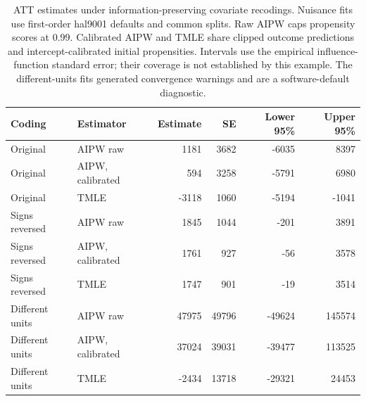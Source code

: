 \begin{table}[ht]
\centering
\small
\caption{ATT estimates under information-preserving covariate recodings.
Nuisance fits use first-order hal9001 defaults and common splits.
Raw AIPW caps propensity scores at 0.99. Calibrated AIPW and TMLE share
clipped outcome predictions and intercept-calibrated initial propensities.
Intervals use the empirical influence-function standard error; their
coverage is not established by this example. The different-units fits
generated convergence warnings and are a software-default diagnostic.}
\label{tab:causal}

\begin{tabular}{llrrrr}
\toprule
Coding & Estimator & Estimate & SE & Lower 95\% & Upper 95\%\\
\midrule
Original & AIPW raw & 1181 & 3682 & -6035 & 8397\\
Original & AIPW, calibrated & 594 & 3258 & -5791 & 6980\\
Original & TMLE & -3118 & 1060 & -5194 & -1041\\
Signs reversed & AIPW raw & 1845 & 1044 & -201 & 3891\\
Signs reversed & AIPW, calibrated & 1761 & 927 & -56 & 3578\\
\addlinespace
Signs reversed & TMLE & 1747 & 901 & -19 & 3514\\
Different units & AIPW raw & 47975 & 49796 & -49624 & 145574\\
Different units & AIPW, calibrated & 37024 & 39031 & -39477 & 113525\\
Different units & TMLE & -2434 & 13718 & -29321 & 24453\\
\bottomrule
\end{tabular}
\end{table}
